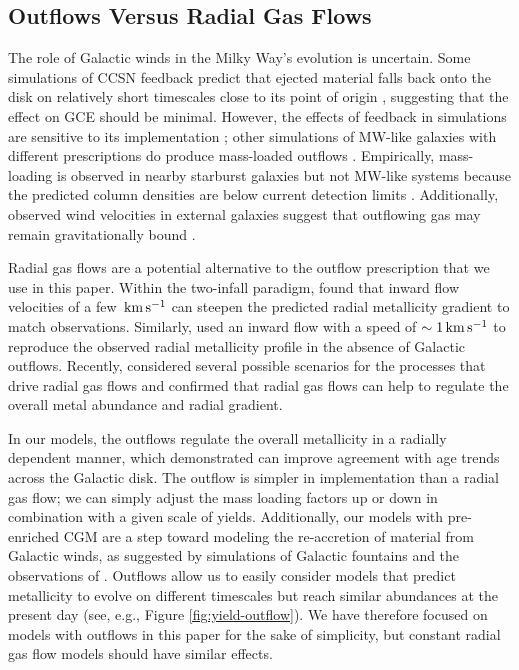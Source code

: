 \documentclass[twocolumn,twocolappendix]{aastex701}
\newcommand{\kms}{\,{\rm km}\,{\rm s}^{-1}}
\begin{document}
\subsection{Outflows Versus Radial Gas Flows}
\label{sec:radial-flows}

The role of Galactic winds in the Milky Way's evolution is uncertain. Some simulations of CCSN feedback predict that ejected material falls back onto the disk on relatively short timescales \citep{spitoni_galactic_2008,spitoni_effects_2009} close to its point of origin \citep{melioli_hydrodynamical_2008,melioli_hydrodynamical_2009}, suggesting that the effect on GCE should be minimal. However, the effects of feedback in simulations are sensitive to its implementation \citep[e.g.,][]{li_effects_2020,hu_code_2023}; other simulations of MW-like galaxies with different prescriptions do produce mass-loaded outflows \citep[e.g.,][]{brook_hierarchical_2011,gutcke_nihao_2017,nelson_first_2019,peschken_angular_2021,kopenhafer_seeking_2023}. Empirically, mass-loading is observed in nearby starburst galaxies \citep[e.g.,][]{lopez_temperature_2020,cameron_duvet_2021,lopez_x-ray_2023} but not MW-like systems because the predicted column densities are below current detection limits \citep[see reviews by][]{veilleux_cool_2020,thompson_theory_2024}. Additionally, observed wind velocities in external galaxies suggest that outflowing gas may remain gravitationally bound \citep{concas_two-faces_2019}.

Radial gas flows are a potential alternative to the outflow prescription that we use in this paper. Within the two-infall paradigm, \citet{spitoni_effects_2011} found that inward flow velocities of a few $\kms$ can steepen the predicted radial metallicity gradient to match observations. Similarly, \citet{palla_chemical_2020,palla_mapping_2024} used an inward flow with a speed of $\sim1\kms$ to reproduce the observed radial metallicity profile in the absence of Galactic outflows. Recently, \citet{johnson_constraints_2025} considered several possible scenarios for the processes that drive radial gas flows and confirmed that radial gas flows can help to regulate the overall metal abundance and radial gradient.

In our models, the outflows regulate the overall metallicity in a radially dependent manner, which \citet{johnson_milky_2025} demonstrated can improve agreement with age trends across the Galactic disk. The outflow is simpler in implementation than a radial gas flow; we can simply adjust the mass loading factors up or down in combination with a given scale of yields. Additionally, our models with pre-enriched CGM are a step toward modeling the re-accretion of material from Galactic winds, as suggested by simulations of Galactic fountains and the observations of \citet{concas_two-faces_2019}. Outflows allow us to easily consider models that predict metallicity to evolve on different timescales but reach similar abundances at the present day (see, e.g., Figure \ref{fig:yield-outflow}). We have therefore focused on models with outflows in this paper for the sake of simplicity, but constant radial gas flow models should have similar effects.
\end{document}
